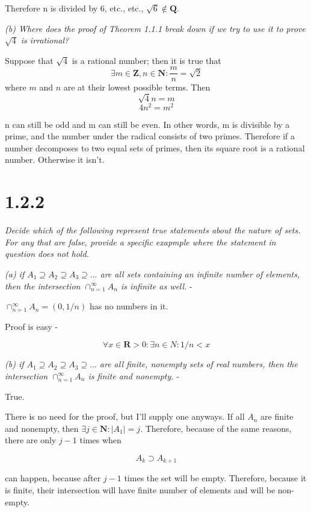 \documentclass[11pt,oneside,titlepage]{book}
\begin{document}
Therefore n is divided by 6, etc., etc., $\sqrt{6} \notin \textbf{Q}$.

\textit{(b) Where does the proof of Theorem 1.1.1 break down if we try to use
  it to prove $\sqrt{4}$ is irrational? }

Suppose that $\sqrt{4}$ is a rational number; then it is true that
$$\exists m \in \textbf{Z}, n \in \textbf{N}: \frac{m}{n} = \sqrt{2}$$
where $m$ and $n$ are at their lowest possible terms. Then
$$\sqrt{4}n = m$$
$$4n^2 = m^2$$

n can still be odd and m can still be even. In other words, m is divisible by
a prime, and the number under the radical consists of two primes. Therefore
if a number decomposes to two equal sets of primes, then its square root is
a rational number. Otherwise it isn't.

\section*{1.2.2}

\textit{Decide which of the following represent true statements about the
  nature of sets. For any that are false, provide a specific exapmple where the
  statement in question does not hold.}

\textit{(a) if $A_1 \supseteq A_2 \supseteq A_3 \supseteq ... $ are all sets
  containing an infinite number of elements, then the intersection
  $\cap_{n = 1}^{\infty} A_n$ is infinite as well.} -

$\cap_{n = 1}^{\infty} A_n = (0, 1/n)$ has no numbers in it.

Proof is easy -

$$\forall x \in \textbf{R} > 0: \exists n \in N: 1/n < x$$

\textit{(b) if $A_1 \supseteq A_2 \supseteq A_3 \supseteq ... $ are all finite,
  nonempty sets of real numbers, then the intersection
  $\cap_{n = 1}^{\infty} A_n$ is finite and nonempty.} -

True.

There is no need for the proof, but I'll supply one anyways. If all $A_n$ are
finite and nonempty, then $\exists j \in \textbf{N} : |A_1| = j$. Therefore,
because of the same reasons, there are only $j - 1$ times when

$$A_k \supset A_{k + 1}$$

can happen, because after $j - 1$ times the set will be empty. Therefore,
because it is finite, their intersection will have finite number of
elements and will be non-empty.
\end{document}

